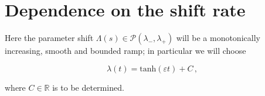 \documentclass[../main.tex]{subfiles}
\begin{document}
\section{Dependence on the shift rate}\label{sec:critical_rate}

Here the parameter shift $\Lambda(s)\in \mathcal{P}(\lambda_{-},\lambda_{+})$ will be a monotonically increasing, smooth and bounded ramp; in particular we will choose 

\begin{equation}\label{eq:tanh_shift}
        \lambda(t) = \text{tanh}(\varepsilon t) + C\,,
\end{equation}

where $C\in \mathbb{R}$ is to be determined.



\end{document}
